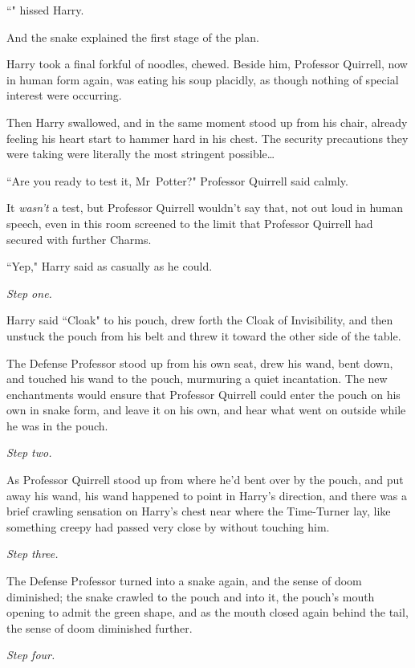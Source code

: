 ``" hissed Harry.

And the snake explained the first stage of the plan.

\later

Harry took a final forkful of noodles, chewed. Beside him, Professor Quirrell, now in human form again, was eating his soup placidly, as though nothing of special interest were occurring.

Then Harry swallowed, and in the same moment stood up from his chair, already feeling his heart start to hammer hard in his chest. The security precautions they were taking were literally the most stringent possible{\ldots}

``Are you ready to test it, Mr~Potter?" Professor Quirrell said calmly.

It \emph{wasn't} a test, but Professor Quirrell wouldn't say that, not out loud in human speech, even in this room screened to the limit that Professor Quirrell had secured with further Charms.

``Yep," Harry said as casually as he could.

\emph{Step one.}

Harry said ``Cloak" to his pouch, drew forth the Cloak of Invisibility, and then unstuck the pouch from his belt and threw it toward the other side of the table.

The Defense Professor stood up from his own seat, drew his wand, bent down, and touched his wand to the pouch, murmuring a quiet incantation. The new enchantments would ensure that Professor Quirrell could enter the pouch on his own in snake form, and leave it on his own, and hear what went on outside while he was in the pouch.

\emph{Step two.}

As Professor Quirrell stood up from where he'd bent over by the pouch, and put away his wand, his wand happened to point in Harry's direction, and there was a brief crawling sensation on Harry's chest near where the Time-Turner lay, like something creepy had passed very close by without touching him.

\emph{Step three.}

The Defense Professor turned into a snake again, and the sense of doom diminished; the snake crawled to the pouch and into it, the pouch's mouth opening to admit the green shape, and as the mouth closed again behind the tail, the sense of doom diminished further.

\emph{Step four.}

